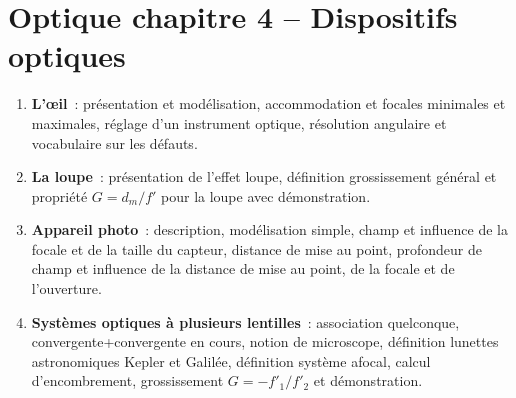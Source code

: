 \documentclass[a4paper, 12pt, final, garamond]{book}
\begin{document}
\section*{Optique chapitre 4 -- Dispositifs optiques}
\begin{enumerate}[label=\Roman*]
    \item \textbf{L'œil}~: présentation et modélisation, accommodation et
        focales minimales et maximales, réglage d'un instrument optique,
        résolution angulaire et vocabulaire sur les défauts.
    \item \textbf{La loupe}~: présentation de l'effet loupe, définition
        grossissement général et propriété $G = d_m/f'$ pour la loupe avec
        démonstration.
    \item \textbf{Appareil photo}~: description, modélisation simple, champ et
        influence de la focale et de la taille du capteur, distance de mise au
        point, profondeur de champ et influence de la distance de mise au point,
        de la focale et de l'ouverture.
    \item \textbf{Systèmes optiques à plusieurs lentilles}~: association
        quelconque, convergente+convergente en cours, notion de microscope,
        définition lunettes astronomiques Kepler et Galilée, définition système
        afocal, calcul d'encombrement, grossissement $G=-f'_1/f'_2$ et
        démonstration.
\end{enumerate}
\end{document}
